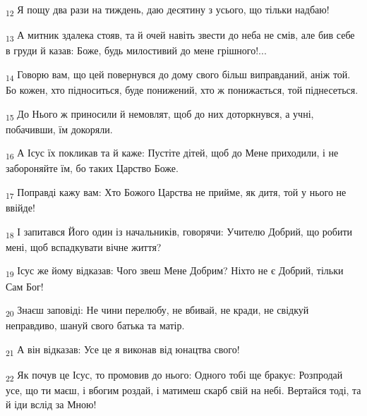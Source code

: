 \begin{tcolorbox}
\textsubscript{12} Я пощу два рази на тиждень, даю десятину з усього, що тільки надбаю!
\end{tcolorbox}
\begin{tcolorbox}
\textsubscript{13} А митник здалека стояв, та й очей навіть звести до неба не смів, але бив себе в груди й казав: Боже, будь милостивий до мене грішного!...
\end{tcolorbox}
\begin{tcolorbox}
\textsubscript{14} Говорю вам, що цей повернувся до дому свого більш виправданий, аніж той. Бо кожен, хто підноситься, буде понижений, хто ж понижається, той піднесеться.
\end{tcolorbox}
\begin{tcolorbox}
\textsubscript{15} До Нього ж приносили й немовлят, щоб до них доторкнувся, а учні, побачивши, їм докоряли.
\end{tcolorbox}
\begin{tcolorbox}
\textsubscript{16} А Ісус їх покликав та й каже: Пустіте дітей, щоб до Мене приходили, і не забороняйте їм, бо таких Царство Боже.
\end{tcolorbox}
\begin{tcolorbox}
\textsubscript{17} Поправді кажу вам: Хто Божого Царства не прийме, як дитя, той у нього не ввійде!
\end{tcolorbox}
\begin{tcolorbox}
\textsubscript{18} І запитався Його один із начальників, говорячи: Учителю Добрий, що робити мені, щоб вспадкувати вічне життя?
\end{tcolorbox}
\begin{tcolorbox}
\textsubscript{19} Ісус же йому відказав: Чого звеш Мене Добрим? Ніхто не є Добрий, тільки Сам Бог!
\end{tcolorbox}
\begin{tcolorbox}
\textsubscript{20} Знаєш заповіді: Не чини перелюбу, не вбивай, не кради, не свідкуй неправдиво, шануй свого батька та матір.
\end{tcolorbox}
\begin{tcolorbox}
\textsubscript{21} А він відказав: Усе це я виконав від юнацтва свого!
\end{tcolorbox}
\begin{tcolorbox}
\textsubscript{22} Як почув це Ісус, то промовив до нього: Одного тобі ще бракує: Розпродай усе, що ти маєш, і вбогим роздай, і матимеш скарб свій на небі. Вертайся тоді, та й іди вслід за Мною!
\end{tcolorbox}
